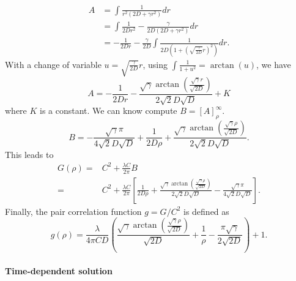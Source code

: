 \documentclass[12pt,english]{article}
\begin{document}
\begin{align}
A & =\int\frac{1}{r^{2}\left(2D+\gamma r^{2}\right)}dr\\
 & =\int\frac{1}{2Dr^{2}}-\frac{\gamma}{2D\left(2D+\gamma r^{2}\right)}dr\\
 & =-\frac{1}{2Dr}-\frac{\gamma}{2D}\int\frac{1}{2D\left(1+\left(\sqrt{\frac{\gamma}{2D}}r\right)^{2}\right)}dr.
\end{align}
With a change of variable $u=\sqrt{\frac{\gamma}{2D}}r$, using $\int\frac{1}{1+u^{2}}=\arctan(u)$,
we have 
\begin{equation}
A=-\frac{1}{2Dr}-\frac{\sqrt{\gamma}\arctan\left(\frac{\sqrt{\gamma}r}{\sqrt{2D}}\right)}{2\sqrt{2}D\sqrt{D}}+K
\end{equation}
where $K$ is a constant. We can know compute $B=[A]_{\rho}^{\infty}.$
\begin{equation}
B=-\frac{\sqrt{\gamma}\pi}{4\sqrt{2}D\sqrt{D}}+\frac{1}{2D\rho}+\frac{\sqrt{\gamma}\arctan\left(\frac{\sqrt{\gamma}\rho}{\sqrt{2D}}\right)}{2\sqrt{2}D\sqrt{D}}.
\end{equation}
This leads to 
\begin{align}
G(\rho)= & C^{2}+\frac{\lambda C}{2\pi}B\\
= & C^{2}+\frac{\lambda C}{2\pi}\left[\frac{1}{2D\rho}+\frac{\sqrt{\gamma}\arctan\left(\frac{\sqrt{\gamma}\rho}{\sqrt{2D}}\right)}{2\sqrt{2}D\sqrt{D}}-\frac{\sqrt{\gamma}\pi}{4\sqrt{2}D\sqrt{D}}\right].
\end{align}
Finally, the pair correlation function $g=G/C^{2}$ is defined as
\begin{equation}
g(\rho)=\frac{\lambda}{4\pi CD}\left(\frac{\sqrt{\gamma}\arctan\left(\frac{\sqrt{\gamma}\rho}{\sqrt{2D}}\right)}{\sqrt{2D}}+\frac{1}{\rho}-\frac{\pi\sqrt{\gamma}}{2\sqrt{2D}}\right)+1.\label{eq:pcf_adv_bbm}
\end{equation}


\paragraph{Time-dependent solution}
\end{document}
